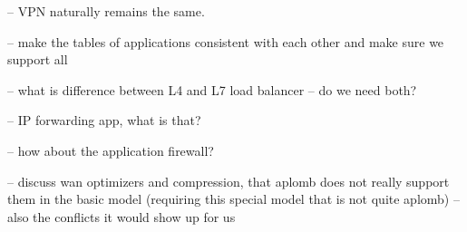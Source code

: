 -- VPN naturally remains the same. 

-- make the tables of applications consistent with each other and make sure we support all 

-- what is difference between L4 and L7 load balancer -- do we need both?

-- IP forwarding app, what is that?

-- how about the application firewall?

-- discuss wan optimizers and compression, that aplomb does not really support them in the basic model (requiring this special model that is not quite aplomb) -- also the conflicts it would show up for us